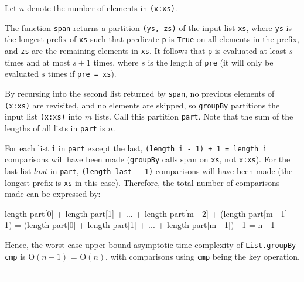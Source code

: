 \documentclass[../main.tex]{subfiles}
\begin{document}



Let $n$ denote the number of elements in \texttt{(x:xs)}.

The function \texttt{span} returns a partition \texttt{(ys, zs)} of the input list \texttt{xs}, where \texttt{ys} is the longest prefix of \texttt{xs} such that predicate \texttt{p} is \texttt{True} on all elements in the prefix, and \texttt{zs} are the remaining elements in \texttt{xs}.  It follows that \texttt{p} is evaluated at least $s$ times and at most $s + 1$ times, where $s$ is the length of \texttt{pre} (it will only be evaluated $s$ times if \texttt{pre = xs}).

By recursing into the second list returned by \texttt{span}, no previous elements of \texttt{(x:xs)} are revisited, and no elements are skipped, so \texttt{groupBy} partitions the input list \texttt{(x:xs)} into $m$ lists.  Call this partition \texttt{part}.  Note that the sum of the lengths of all lists in \texttt{part} is $n$.

For each list \texttt{i} in \texttt{part} except the last, \texttt{(length i - 1) + 1 = length i} comparisons will have been made (\texttt{groupBy} calls span on \texttt{xs}, not \texttt{x:xs}).  For the last list $last$ in \texttt{part}, \texttt{(length last - 1)} comparisons will have been made (the longest prefix is \texttt{xs} in this case).  Therefore, the total number of comparisons made can be expressed by:

\begin{code}
length part[0] + length part[1] + ... + length part[m - 2] + (length part[m - 1] - 1)
= (length part[0] + length part[1] + ... + length part[m - 1]) - 1
= n - 1
\end{code}

Hence, the worst-case upper-bound asymptotic time complexity of \texttt{List.groupBy cmp} is O$(n - 1)$ = O$(n)$, with comparisons using \texttt{cmp} being the key operation.
\qedsymbol

--
\end{document}
